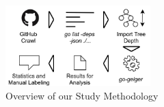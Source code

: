 \begin{figure}[!t]
    \includegraphics[width=0.5\textwidth]{gfx/figures/study-methodology.png}
    \caption{Overview of our Study Methodology}
    \label{fig:study-overview}
\end{figure}
